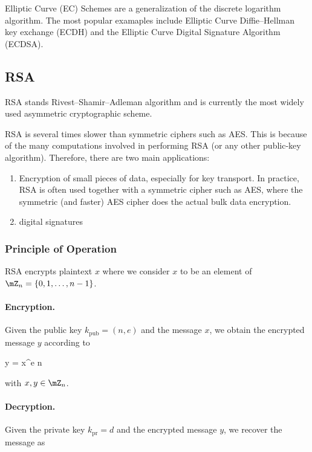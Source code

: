 Elliptic Curve (EC) Schemes are a generalization of the discrete logarithm algorithm. The most popular examaples include Elliptic Curve Diffie–Hellman key exchange (ECDH) and the Elliptic Curve Digital Signature Algorithm (ECDSA).


\subsection{RSA}


RSA stands Rivest–Shamir–Adleman algorithm and is currently the most widely used asymmetric cryptographic scheme.

RSA is several times slower than symmetric ciphers such as AES. This is because of the many computations involved in performing RSA (or any other public-key algorithm). Therefore, there are two main applications:

\begin{enumerate}
	\item Encryption of small pieces of data, especially for key transport. In practice, RSA is often used together with a symmetric cipher such as AES, where the symmetric (and faster) AES cipher does the actual bulk data encryption.

	\item digital signatures
\end{enumerate}


\subsubsection{Principle of Operation}

RSA encrypts plaintext $x$ where we consider $x$ to be an element of $\mZ_n = \{0,1,\ldots,n-1\}$.

\paragraph{Encryption.} Given the public key $k_{\text{pub}} = (n,e)$ and the message $x$, we obtain the encrypted message $y$ according to

\bee
y = x^e \bmod n
\eee 

with $x,y \in \mZ_n$.

\paragraph{Decryption.} Given the private key $k_{\text{pr}} = d$ and the encrypted message $y$, we recover the message as

